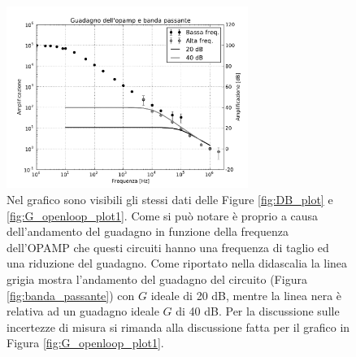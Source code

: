 \begin{figure}[h]
\centering
    \includegraphics[width=0.7\textwidth]{Figure/gabp.pdf}
    \caption{Nel grafico sono visibili gli stessi dati delle Figure \ref{fig:DB_plot} e \ref{fig:G_openloop_plot1}. Come si può notare è proprio a causa dell'andamento del guadagno in funzione della frequenza dell'OPAMP che questi circuiti hanno una frequenza di taglio ed una riduzione del guadagno. Come riportato nella didascalia la linea grigia mostra l'andamento del guadagno del circuito (Figura \ref{fig:banda_passante}) con $G$ ideale di 20 dB, mentre la linea nera è relativa ad un guadagno ideale $G$ di 40 dB. Per la discussione sulle incertezze di misura si rimanda alla discussione fatta per il grafico in Figura \ref{fig:G_openloop_plot1}.}
    \label{fig:G_openloop_plot2}
\end{figure}
